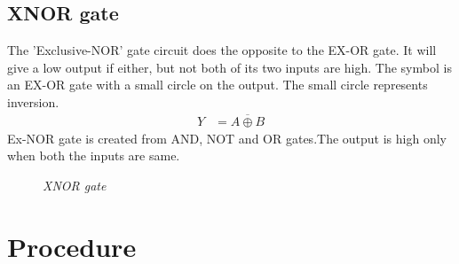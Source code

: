 	\subsection{XNOR gate}
		The 'Exclusive-NOR' gate circuit does the opposite to the EX-OR gate. It will give a low output if either, but not both of its two inputs are high. The symbol is an EX-OR gate with a small circle on the output. The small circle represents inversion.
		\begin{align*}
			Y &= \overline{A \oplus B}
		\end{align*}		
		Ex-NOR gate is created from AND, NOT and OR gates.The output is high only when both the inputs are same.
		\begin{figure}[ht]
			\centering 
			\hfill
			\hfill
			\caption{\textit{XNOR gate}}
		\end{figure}
		
\section{Procedure}
